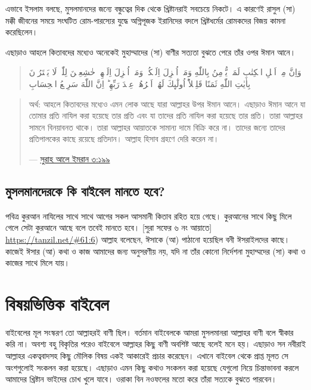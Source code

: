 \documentclass[
]{book}
\begin{document}
এভাবে ইসলাম বলছে, মুসলমানদের জন্যে বন্ধুত্বের দিক থেকে খ্রিষ্টানরাই সবচেয়ে নিকটে। এ কারণেই রাসুল (সা) মক্কী জীবনের সময়ে সংঘটিত রোম-পারস্যের যুদ্ধে অগ্নিপূজক ইরানিদের বদলে খ্রিষ্টধর্মের রোমকদের বিজয় কামনা করেছিলেন।

এছাড়াও আহলে কিতাবদের মধ্যেও অনেকেই মুহাম্মাদের (সা) বাণীর সত্যতা বুঝতে পেরে তাঁর ওপর ঈমান আনে।

\begin{quote}
وَاِنَّ مِنۡ اَهۡلِ الۡكِتٰبِ لَمَنۡ يُّؤۡمِنُ بِاللّٰهِ وَمَاۤ اُنۡزِلَ اِلَيۡكُمۡ وَمَاۤ اُنۡزِلَ اِلَيۡهِمۡ خٰشِعِيۡنَ لِلّٰهِۙ لَا يَشۡتَرُوۡنَ بِاٰيٰتِ اللّٰهِ ثَمَنًا قَلِيۡلاً‌ؕ اُولٰٓٮِٕكَ لَهُمۡ اَجۡرُهُمۡ عِنۡدَ رَبِّهِمۡ‌ؕ اِنَّ اللّٰهَ سَرِيۡعُ الۡحِسَابِ
\end{quote}

\begin{quote}
অর্থ: আহলে কিতাবদের মধ্যেও এমন লোক আছে যারা আল্লাহর উপর ঈমান আনে। এছাড়াও ঈমান আনে যা তোমার প্রতি নাযিল করা হয়েছে তার প্রতি এবং যা তাদের প্রতি নাযিল করা হয়েছে তার প্রতি। তারা আল্লাহর সামনে বিনয়াবনত থাকে। তারা আল্লাহর আয়াতকে সামান্য দামে বিক্রি করে না। তাদের জন্যে তাদের প্রতিপালকের কাছে রয়েছে প্রতিদান। আল্লাহ হিসাব গ্রহণে দেরি করেন না।

--- \href{http://tafheembangla.com/index.php/quran?show=quran\&surah_no=3\&limitstart=198}{সুরাহ আলে ইমরান ৩:১৯৯}
\end{quote}

\hypertarget{following-bible}{%
\section*{মুসলমানদেরকে কি বাইবেল মানতে হবে?}\label{following-bible}}

পবিত্র কুরআন নাযিলের সাথে সাথে আগের সকল আসমানী কিতাব রহিত হয়ে গেছে। কুরআনের সাথে কিছু মিলে গেলে সেটা কুরআনে আছে বলে তবেই মানতে হবে। {[}সুরা সফের ৬ নং আয়াতে{]} \url{https://tanzil.net/\#61:6}) আল্লাহ বলেছেন, ঈসাকে (আ) পাঠানো হয়েছিল বনী ঈসরাইলদের কাছে। কাজেই ঈসার (আ) কথা ও কাজ আমাদের জন্য অনুসরণীয় নয়, যদি না তাঁর কোনো নির্দেশনা মুহাম্মদের (সা) কথা ও কাজের সাথে মিলে যায়।

\hypertarget{bible-index}{%
\chapter*{বিষয়ভিত্তিক বাইবেল}\label{bible-index}}

বাইবেলের মূল সংস্করণ তো আল্লাহরই বাণী ছিল। বর্তমান বাইবেলকে আমরা মুসলমানরা আল্লাহর বাণী বলে স্বীকার করি না। অবশ্য বহু বিকৃতির পরেও বাইবেলে আল্লাহর কিছু বাণী অবশিষ্ট আছে বলেই মনে হয়। এছাড়াও সন নবীরাই আল্লাহর একত্ববাদসহ কিছু মৌলিক বিষয় একই আকারেই প্রচার করেছেন। এখানে বাইবেল থেকে প্রাপ্ত মূলত সে অংশগুলোই সংকলন করা হয়েছে। এছাড়াও এমন কিছু কথাও সংকলন করা হয়েছে যেগুলো নিয়ে চিন্তাভাবনা করলে আমাদের খ্রিষ্টান ভাইদের চোখ খুলে যাবে। ওরাকা বিন নওফলের মতো করে তাঁরা সত্যকে বুঝতে পারবেন।
\end{document}
